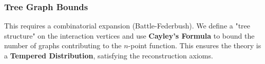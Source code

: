 \subsubsection{Tree Graph Bounds}
This requires a combinatorial expansion (Battle-Federbush). We define a "tree structure" on the interaction vertices and use \textbf{Cayley's Formula} to bound the number of graphs contributing to the $n$-point function. This ensures the theory is a \textbf{Tempered Distribution}, satisfying the reconstruction axioms.


